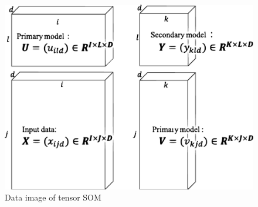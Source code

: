 \begin{figure}[tbh]
 \centering
  \includegraphics[clip,width=15.0cm]{figure/tensor_shape2.eps}
  \caption{Data image of tensor SOM}
  \label{fig: tensor_shape}
\end{figure}

